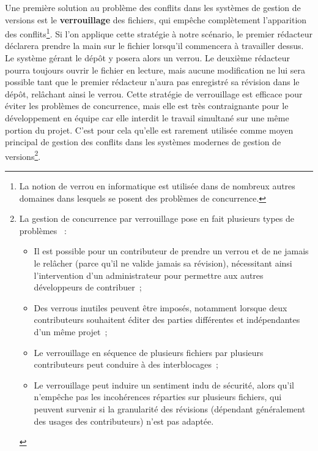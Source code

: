 Une première solution au problème des conflits dans les systèmes de
gestion de versions est le \textbf{verrouillage} des
fichiers, qui empêche complètement l'apparition des
conflits\footnote{La notion de verrou en informatique est utilisée
  dans de nombreux autres domaines dans lesquels se posent des
  problèmes de concurrence.}. Si l'on applique cette stratégie à notre
scénario, le premier rédacteur déclarera prendre la main sur le
fichier lorsqu'il commencera à travailler dessus. Le système gérant le
dépôt y posera alors un verrou. Le deuxième rédacteur pourra toujours
ouvrir le fichier en lecture, mais aucune modification ne lui sera
possible tant que le premier rédacteur n'aura pas enregistré sa
révision dans le dépôt, relâchant ainsi le verrou. Cette stratégie de
verrouillage est efficace pour éviter les problèmes de concurrence,
mais elle est très contraignante pour le développement en équipe car
elle interdit le travail simultané sur une même portion du
projet. C'est pour cela qu'elle est rarement utilisée comme moyen
principal de gestion des conflits dans les systèmes modernes de
gestion de versions\footnote{La gestion de concurrence par
  verrouillage pose en fait plusieurs types de problèmes
  \cite[chap.~1]{SVNbook}~:
  \begin{itemize}
  \item Il est possible pour un contributeur de prendre un verrou et
    de ne jamais le relâcher (parce qu'il ne valide jamais sa
    révision), nécessitant ainsi l'intervention d'un administrateur
    pour permettre aux autres développeurs de contribuer~;
  \item Des verrous inutiles peuvent être imposés, notamment lorsque
    deux contributeurs souhaitent éditer des parties différentes et
    indépendantes d'un même projet~;
  \item Le verrouillage en séquence de plusieurs fichiers par
    plusieurs contributeurs peut conduire à des interblocages~;
  \item Le verrouillage peut induire un sentiment indu de sécurité,
    alors qu'il n'empêche pas les incohérences réparties sur plusieurs
    fichiers, qui peuvent survenir si la granularité des révisions
    (dépendant généralement des usages des contributeurs) n'est pas
    adaptée.
  \end{itemize}
}.

